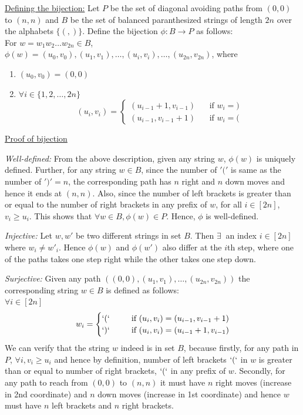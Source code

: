 \noindent\underline{Defining the bijection:} Let $P$ be the set of diagonal avoiding paths from $(0,0)$ to $(n,n)$  and $B$ be the set of balanced paranthesized  strings of length $2n$ over the alphabets $\{(,)\}$. Define the bijection $\phi:B\rightarrow P$ as follows:\\
For $w=w_1 w_2 \ldots w_{2n}\in B$, $\phi(w) = (u_0,v_0), (u_1,v_1), \ldots, (u_i, v_i), \ldots, (u_{2n}, v_{2n})$, where 
\begin{enumerate}
    \item $(u_0,v_0)=(0,0)$ 
    \item $\forall i\in\{1,2,\ldots, 2n\}$\\
    \[
    (u_i, v_i) = 
    \begin{cases}  
    (u_{i-1}+1, v_{i-1})& ~~~~\text{if }w_i=)\\
    (u_{i-1}, v_{i-1}+1)&~~~~\text{if }w_i=(
    \end{cases}
    \]
\end{enumerate}
\underline{Proof of bijection}
\begin{description}
\item \textit{Well-defined:} From the above description, given any string $w$, $\phi(w)$ is uniquely defined. Further, for any string $w\in B$, since the number of $'('$ is same as  the number of $')' = n$, the corresponding path has $n$ right and $n$ down moves and hence it ends at $(n,n)$. Also, since the number of left brackets is greater than or equal to the number of right brackets in any prefix of $w$, for all $i\in[2n]$, $v_i\ge u_i$. This shows that $\forall w\in B, \phi(w)\in P$. Hence,  $\phi$ is well-defined.
\item \textit{Injective:} Let $w, w'$ be two different strings in set $B$. Then $\exists~$ an index $i\in[2n]$ where $w_i\ne w'_i$. Hence $\phi(w)$ and $\phi(w')$ also differ at the $i$th step, where one of the paths takes one step right while the other takes one step down. 
\item \textit{Surjective:} 
Given any path $((0,0), (u_1, v_1), \ldots, (u_{2n}, v_{2n}))$ the corresponding string $w\in B$ is defined as follows:\\
$\forall i\in[2n]$
\[
w_i = 
\begin{cases}
`(`& ~~~~~\text{if } (u_i, v_i) = (u_{i-1}, v_{i-1}+1)\\
`)`& ~~~~~\text{if } (u_i,v_i) = (u_{i-1}+1, v_{i-1})
\end{cases}
\]
We can verify that the string $w$ indeed is in set $B$, because firstly, for any path in $P$, $\forall i, v_i\ge u_i$ and hence by definition, number of left brackets $`(`$ in $w$ is greater than or equal to number of right brackets, $`(`$ in any prefix of $w$. Secondly, for any path to reach from $(0,0)$ to $(n,n)$ it must have $n$ right moves (increase in 2nd coordinate) and $n$ down moves (increase in 1st coordinate) and hence $w$ must have $n$ left brackets and $n$ right brackets.
\end{description}


